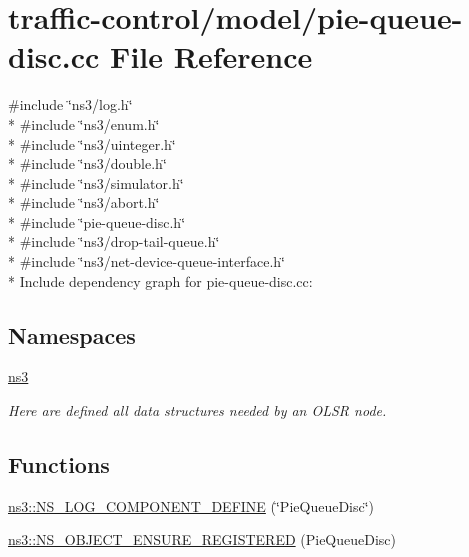 \hypertarget{pie-queue-disc_8cc}{}\section{traffic-\/control/model/pie-\/queue-\/disc.cc File Reference}
\label{pie-queue-disc_8cc}
{\ttfamily \#include \char`\"{}ns3/log.\+h\char`\"{}}\\*
{\ttfamily \#include \char`\"{}ns3/enum.\+h\char`\"{}}\\*
{\ttfamily \#include \char`\"{}ns3/uinteger.\+h\char`\"{}}\\*
{\ttfamily \#include \char`\"{}ns3/double.\+h\char`\"{}}\\*
{\ttfamily \#include \char`\"{}ns3/simulator.\+h\char`\"{}}\\*
{\ttfamily \#include \char`\"{}ns3/abort.\+h\char`\"{}}\\*
{\ttfamily \#include \char`\"{}pie-\/queue-\/disc.\+h\char`\"{}}\\*
{\ttfamily \#include \char`\"{}ns3/drop-\/tail-\/queue.\+h\char`\"{}}\\*
{\ttfamily \#include \char`\"{}ns3/net-\/device-\/queue-\/interface.\+h\char`\"{}}\\*
Include dependency graph for pie-\/queue-\/disc.cc\+:
\subsection*{Namespaces}
\begin{DoxyCompactItemize}
\item 
 \hyperlink{namespacens3}{ns3}
\begin{DoxyCompactList}\small\item\em Here are defined all data structures needed by an O\+L\+SR node. \end{DoxyCompactList}\end{DoxyCompactItemize}
\subsection*{Functions}
\begin{DoxyCompactItemize}
\item 
\hyperlink{namespacens3_a79f4ad9ad12551213cd85a5d68ddff06}{ns3\+::\+N\+S\+\_\+\+L\+O\+G\+\_\+\+C\+O\+M\+P\+O\+N\+E\+N\+T\+\_\+\+D\+E\+F\+I\+NE} (\char`\"{}Pie\+Queue\+Disc\char`\"{})
\item 
\hyperlink{namespacens3_a2044ea165cb189c9c4a32e56b78b2f32}{ns3\+::\+N\+S\+\_\+\+O\+B\+J\+E\+C\+T\+\_\+\+E\+N\+S\+U\+R\+E\+\_\+\+R\+E\+G\+I\+S\+T\+E\+R\+ED} (Pie\+Queue\+Disc)
\end{DoxyCompactItemize}
